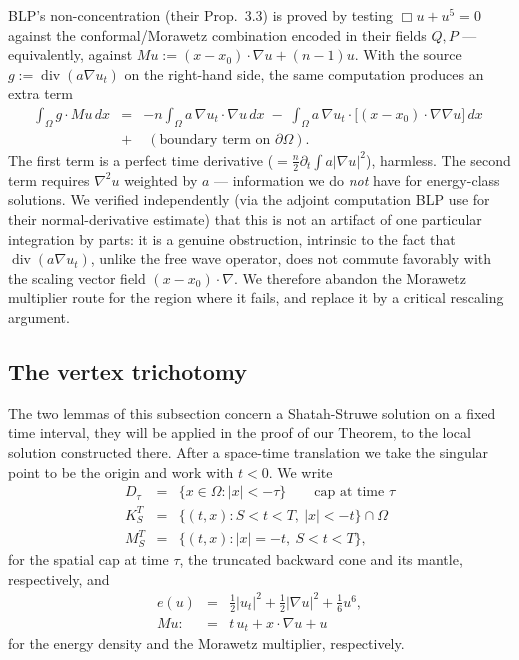 \documentclass[11pt,letterpaper]{amsart}
\newcommand{\dive}{\operatorname{div}}
\newcommand{\Om}{\Omega}
\begin{document}
BLP's \cite{BurqLebeauPlanchon} non-concentration (their Prop.\ 3.3) is proved by testing $\Box u+u^5=0$ against the conformal/Morawetz combination encoded in their fields $Q,P$ --- equivalently, against $Mu := (x-x_0)\cdot\nabla u+(n-1)u$. With the source $g:=\dive(a\nabla u_t)$ on the right-hand side, the same computation produces an extra term
\begin{eqnarray*}
\int_\Om g\cdot Mu\,dx &=& -n\int_\Om a\,\nabla u_t\cdot\nabla u\,dx \;-\; \int_\Om a\,\nabla u_t\cdot\big[(x-x_0)\cdot\nabla\nabla u\big]\,dx \;\\
&+&\; (\text{boundary term on }\partial\Om).
\end{eqnarray*}
The first term is a perfect time derivative ($=\tfrac n2\partial_t\int a|\nabla u|^2$), harmless. The second term requires $\nabla^2u$ weighted by $a$ --- information we do \emph{not} have for energy-class solutions. We verified independently (via the adjoint computation BLP use for their normal-derivative estimate) that this is not an artifact of one particular integration by parts: it is a genuine obstruction, intrinsic to the fact that $\dive(a\nabla u_t)$, unlike the free wave operator, does not commute favorably with the scaling vector field $(x-x_0)\cdot\nabla$. We therefore abandon the Morawetz multiplier route for the region where it fails, and replace it by a critical rescaling argument.

\subsection{The vertex trichotomy}

The two lemmas of this subsection concern a Shatah-Struwe solution on a fixed time interval,
 they will be applied in the proof of our Theorem, to the local solution constructed there. After a space-time translation we take the singular point to be the origin and work with $t<0$. We write
 \begin{eqnarray*}
D_\tau&=&\{x\in\Omega:|x|<-\tau\}\qquad\text{cap at time }\tau\\
K_S^T&=&\{(t,x):S<t<T,\ |x|<-t\}\cap\Omega\\
M_S^T&=&\{(t,x):|x|=-t,\ S<t<T\},
\end{eqnarray*}
for the spatial cap at time $\tau$, the truncated backward cone and its mantle, respectively, and
\begin{eqnarray*}
e(u)&=&\tfrac12|u_t|^2+\tfrac12|\nabla u|^2+\tfrac16 u^6,\\
Mu:&=&t\,u_t+x\cdot\nabla u+u
\end{eqnarray*}
for the energy density and the Morawetz multiplier, respectively.
\end{document}
